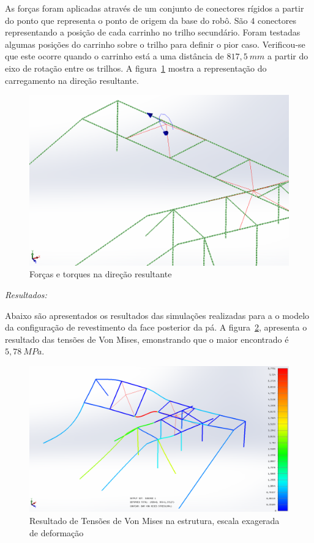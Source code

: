 As forças foram aplicadas através de um conjunto de conectores rígidos a partir
do ponto que representa o ponto de origem da base do robô. São $4$ conectores
representando a posição de cada carrinho no trilho secundário. Foram testadas
algumas posições do carrinho sobre o trilho para definir o pior caso.
Verificou-se que este ocorre quando o carrinho está a uma distância de
$817,5~mm$ a partir do eixo de rotação entre os trilhos. 
A figura~\ref{fig::carregamento} mostra a representação do carregamento na
direção resultante.

\begin{figure}[h!]
	\centering
	\includegraphics[width=0.9\columnwidth]{figs/dimensionamento/carregamento}
	\caption{Forças e torques na direção resultante}
    \label{fig::carregamento}
\end{figure}


\textit{Resultados:}

Abaixo são apresentados os resultados das simulações realizadas para a o modelo
da configuração de revestimento da face posterior da pá. 
A figura~\ref{fig::von_mises}, apresenta o resultado das tensões de Von Mises, 
emonstrando que o maior encontrado é $5,78~MPa$.

\begin{figure}[h!]
	\centering
	\includegraphics[width=0.9\columnwidth]{figs/dimensionamento/von_mises}
	\caption{Resultado de Tensões de Von Mises na estrutura, escala exagerada de
	deformação}
    \label{fig::von_mises}
\end{figure}

